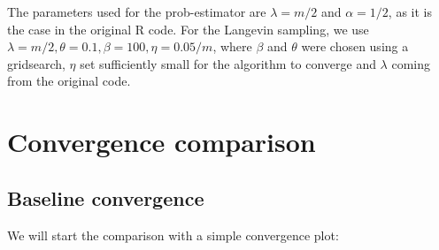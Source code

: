 \documentclass[12pt]{memoir}
\begin{document}
The parameters used for the prob-estimator are $\lambda=m/2$ and $\alpha=1/2$, as it is the case in the original R code. For the Langevin sampling, we use $\lambda=m/2,\theta=0.1,\beta=100,\eta=0.05/m$, where $\beta$ and $\theta$ were chosen using a gridsearch, $\eta$ set sufficiently small for the algorithm to converge and $\lambda$ coming from the original code.

\section{Convergence comparison}\label{section:convergence-comparison}

\subsection*{Baseline convergence}

We will start the comparison with a simple convergence plot:
\end{document}
